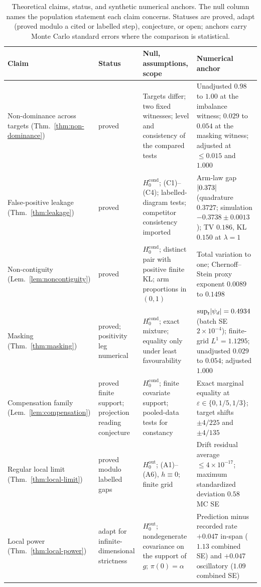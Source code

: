 \begin{table}[t]
\centering
\small
\caption{Theoretical claims, status, and synthetic numerical anchors. The null column names the population statement each claim concerns. Statuses are proved, adapt (proved modulo a cited or labelled step), conjecture, or open; anchors carry Monte Carlo standard errors where the comparison is statistical.}
\label{tab:theory-claim-status}
\begin{tabular}{p{3.1cm} p{1.8cm} p{4.6cm} p{4.6cm}}
\hline
Claim & Status & Null, assumptions, scope & Numerical anchor \\
\hline
Non-dominance across targets (Thm.~\ref{thm:non-dominance}) & proved & Targets differ; two fixed witnesses; level and consistency of the compared tests & Unadjusted $0.98$ to $1.00$ at the imbalance witness; $0.029$ to $0.054$ at the masking witness; adjusted at $\le0.015$ and $1.000$ \\
False-positive leakage (Thm.~\ref{thm:leakage}) & proved & $H_0^{\mathrm{cond}}$; (C1)--(C4); labelled-diagram tests; competitor consistency imported \citep{robinson_turner_2017,gretton_2012,han_kim_kim_2026,murris_strand_2026,moon_lazar_2023,dubey_muller_2019} & Arm-law gap $\lvert 0.373\rvert$ (quadrature $0.3727$; simulation $-0.3738\pm0.0013$); TV $0.186$, KL $0.150$ at $\lambda=1$ \\
Non-contiguity (Lem.~\ref{lem:noncontiguity}) & proved & $H_0^{\mathrm{cond}}$; distinct pair with positive finite KL; arm proportions in $(0,1)$ & Total variation to one; Chernoff--Stein proxy exponent $0.0089$ to $0.1498$ \citep{chernoff_1952} \\
Masking (Thm.~\ref{thm:masking}) & proved; positivity leg numerical & $H_0^{\mathrm{cond}}$; exact mixture; equality only under least favourability & $\sup_t\lvert \psi_d\rvert=0.4934$ (batch SE $2\times10^{-4}$); finite-grid $L^1=1.1295$; unadjusted $0.029$ to $0.054$; adjusted $1.000$ \\
Compensation family (Lem.~\ref{lem:compensation}) & proved finite support; projection reading conjecture & $H_0^{\mathrm{cond}}$; finite covariate support; pooled-data tests for constancy & Exact marginal equality at $\varepsilon\in\{0,1/5,1/3\}$; target shifts $\pm4/225$ and $\pm4/135$ \\
Regular local limit (Thm.~\ref{thm:local-limit}) & proved modulo labelled gaps & $H_0^{\mathrm{out}}$; (A1)--(A6), $h\equiv0$; finite grid & Drift residual average $\le4\times10^{-17}$; maximum standardized deviation $0.58$ MC SE \\
Local power (Thm.~\ref{thm:local-power}) & adapt for infinite-dimensional strictness & $H_0^{\mathrm{out}}$; nondegenerate covariance on the support of $g$; $\pi(0)=\alpha$ & Prediction minus recorded rate $+0.047$ in-span ($1.13$ combined SE) and $+0.047$ oscillatory ($1.09$ combined SE) \\

\end{tabular}
\end{table}

